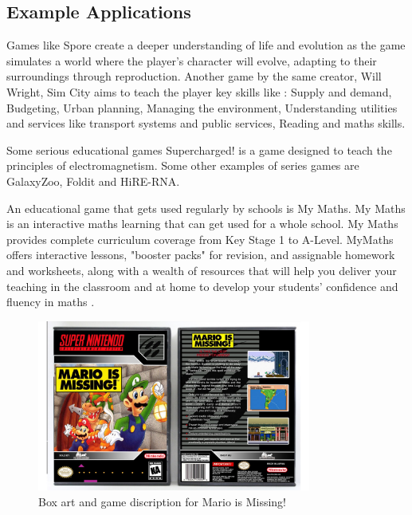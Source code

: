 	\subsection{Example Applications}
		\label{sub_sec:example_apps}
	
	Games like Spore create a deeper understanding of life and evolution as the game simulates a world where the player's character will evolve, adapting to their surroundings through reproduction. Another game by the same creator, Will Wright, Sim City aims to teach the player key skills like \cite{27}: Supply and demand, Budgeting, Urban planning, Managing the environment, Understanding utilities and services like transport systems and public services, Reading and maths skills.
	
	Some serious educational games Supercharged! \cite{squire2003harnessing} is a game designed to teach the principles of electromagnetism. Some other examples of series games are GalaxyZoo, Foldit and HiRE-RNA.
	
	An educational game that gets used regularly by schools is My Maths.
	My Maths is an interactive maths learning that can get used for a whole school. My Maths provides complete curriculum coverage from Key Stage 1 to A-Level. MyMaths offers interactive lessons, "booster packs" for revision, and assignable homework and worksheets, along with a wealth of resources that will help you deliver your teaching in the classroom and at home to develop your students' confidence and fluency in maths \cite{my_maths}.
	
	\begin{figure}[t]
		\begin{center}
			\includegraphics[width=9cm]{graphics/Mario_is_Missing_box_art.jpg}
			\caption{Box art and game discription for Mario is Missing! \cite{gaming_relics}}
			\label{fig:mario_is_missing}
		\end{center}
		
	\end{figure}
	
